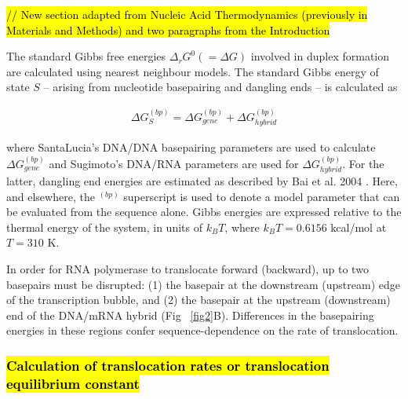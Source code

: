 \documentclass[10pt,letterpaper]{article}
\begin{document}
\textcolor{red}{\hl{ // New section adapted from Nucleic Acid Thermodynamics (previously in Materials and Methods) and two paragraphs from the Introduction}}


The standard Gibbs free energies $\Delta_r G^0 ( = \Delta G)$  involved in duplex formation are calculated using nearest neighbour models. The standard Gibbs energy of state $S$ -- arising from nucleotide basepairing and dangling ends -- is calculated as


\begin{eqnarray}
    \Delta G^{(bp)}_{S} =\Delta G^{(bp)}_{gene} +  \Delta G^{(bp)}_{hybrid}
\end{eqnarray}

where SantaLucia's DNA/DNA basepairing parameters \cite{santalucia1998unified} are used to calculate $\Delta G^{(bp)}_{gene}$ and Sugimoto's DNA/RNA parameters \cite{wu2002temperature} are used for $\Delta G^{(bp)}_{hybrid}$. For the latter, dangling end energies are estimated as described by Bai et al. 2004 \cite{bai2004sequence}. Here, and elsewhere, the $^{(bp)}$ superscript is used to denote a model parameter that can be evaluated from the sequence alone. Gibbs energies are expressed relative to the thermal energy of the system,  in units of $k_BT$, where $k_BT = 0.6156$ kcal/mol at $T=310$ K. \par





In order for RNA polymerase to translocate forward (backward), up to two basepairs must be disrupted: (1) the basepair at the downstream (upstream) edge of the transcription bubble, and (2) the basepair at the upstream (downstream) end of the DNA/mRNA hybrid (Fig ~\ref{fig2}B). Differences in the basepairing energies in these regions confer sequence-dependence on the rate of translocation.


\subsubsection*{\hl{Calculation of translocation rates or translocation equilibrium constant}}
\end{document}
